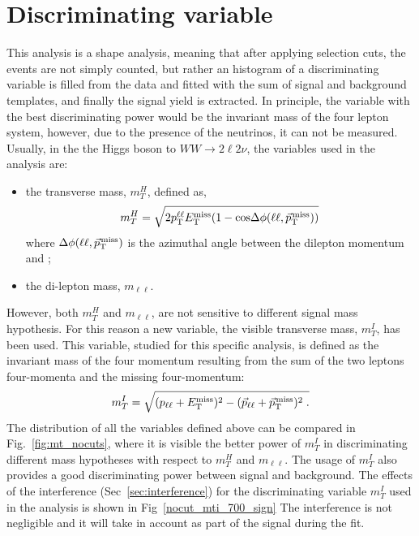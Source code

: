 \section{Discriminating variable}
This analysis is a shape analysis, meaning that after applying selection cuts, the events are not simply counted, but rather an histogram of a discriminating variable is filled from the data and fitted with the sum of signal and background templates, and finally the signal yield is extracted.
In principle, the variable with the best discriminating power would be the invariant mass of
the four lepton system, however, due to the presence of the neutrinos, it can not be measured.
Usually, in the the Higgs boson to $WW \to 2\ell 2\nu $, the variables used in the analysis are:
\begin{itemize}
\item the transverse mass, $m_T^H$, defined as,  
\begin{equation}
 m_T^H = \sqrt{2p_{\rm T}^{\ell\ell}E_{\mathrm{T}}^{\text{miss}}(1-\mathrm{cos}\Delta\phi(\ell\ell, {\vec p}_{\mathrm{T}}^{\kern1pt\text{miss}}))}
\end{equation}
where $\Delta\phi(\ell\ell, {\vec p}_{\mathrm{T}}^{\kern1pt\text{miss}})$ is the azimuthal angle between the dilepton momentum and \ptvecmiss;
\item the di-lepton mass, $m_{\ell \ell}$.
\end{itemize}
However, both $m_T^H$ and $m_{\ell \ell}$, are not sensitive to different
signal mass hypothesis. For this reason a new variable, the visible transverse mass,  $m_T^I$, has been used.
This variable, studied for this specific analysis, is defined as the invariant mass of the four momentum resulting from the sum of the
two leptons four-momenta and the missing four-momentum: 
\begin{equation}
 m_T^I = \sqrt{ (p_\mathrm{\ell\ell} + E_{\mathrm{T}}^{\text{miss}})^2 - (\vec{p}_\mathrm{\ell\ell} + {\vec p}_{\mathrm{T}}^{\kern1pt\text{miss}})^2 \; .}
\end{equation}
The distribution of all the variables defined above can be compared in 
Fig.~\ref{fig:mt_nocuts}, where it is visible the better power of $m_T^I$ in discriminating different mass hypotheses with respect to  $m_T^H$ and $m_{\ell \ell}$. The usage of  $m_T^I$ also provides a good discriminating power between signal and background.
The effects of the interference (Sec~\ref{sec:interference}) for the discriminating variable  $m_T^I$  used in the analysis is shown in Fig~\ref{nocut_mti_700_sign}
The interference is not negligible and it will take in account as part of the signal during the fit.
